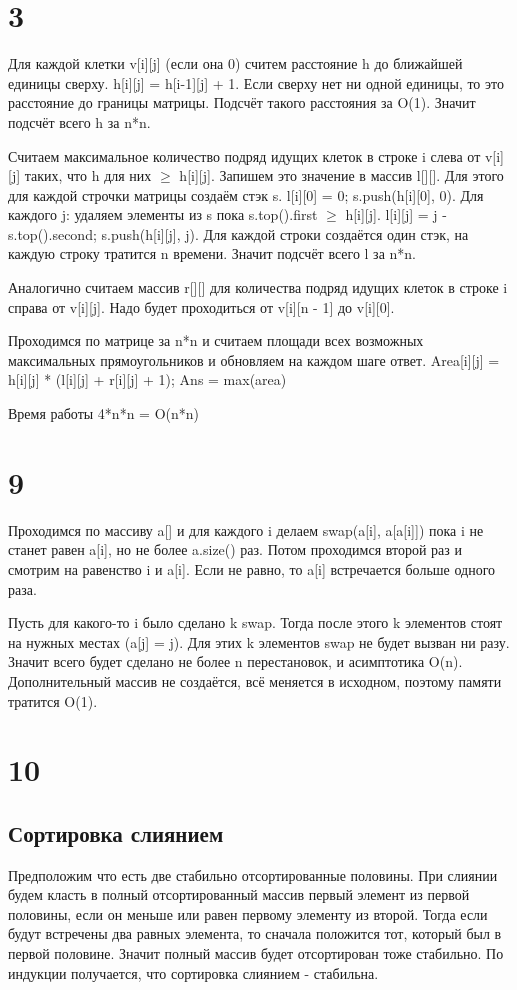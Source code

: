 \documentclass[12pt]{extarticle}
\begin{document}
\section*{3}
Для каждой клетки v[i][j] (если она 0) считем расстояние h до ближайшей единицы сверху. h[i][j] = h[i-1][j] + 1. Если сверху нет ни одной единицы, то это расстояние до границы матрицы. Подсчёт такого расстояния за O(1). Значит подсчёт всего h за n*n.

Считаем максимальное количество подряд идущих клеток в строке i слева от v[i][j] таких, что h для них $\ge$ h[i][j]. Запишем это значение в массив l[][]. Для этого для каждой строчки матрицы создаём стэк s. l[i][0] = 0; s.push({h[i][0], 0}). Для каждого j: удаляем элементы из s пока s.top().first $\ge$ h[i][j]. l[i][j] = j - s.top().second; s.push({h[i][j], j}). Для каждой строки создаётся один стэк, на каждую строку тратится n времени. Значит подсчёт всего l за n*n.

Аналогично считаем массив r[][] для количества подряд идущих клеток в строке i справа от v[i][j]. Надо будет проходиться от v[i][n - 1] до v[i][0].

Проходимся по матрице за n*n и считаем площади всех возможных максимальных прямоугольников и обновляем на каждом шаге ответ. Area[i][j] = h[i][j] * (l[i][j] + r[i][j] + 1); Ans = max(area)

Время работы 4*n*n = O(n*n)

\section*{9}
Проходимся по массиву a[] и для каждого i делаем swap(a[i], a[a[i]]) пока i не станет равен a[i], но не более a.size() раз. Потом проходимся второй раз и смотрим на равенство i и a[i]. Если не равно, то a[i] встречается больше одного раза.

Пусть для какого-то i было сделано k swap. Тогда после этого k элементов стоят на нужных местах (a[j] = j). Для этих k элементов swap не будет вызван ни разу. Значит всего будет сделано не более n перестановок, и асимптотика O(n). Дополнительный массив не создаётся, всё меняется в исходном, поэтому памяти тратится O(1).

\section*{10}
\subsection*{Сортировка слиянием}
Предположим что есть две стабильно отсортированные половины. При слиянии будем класть в полный отсортированный массив первый элемент из первой половины, если он меньше или равен первому элементу из второй. Тогда если будут встречены два равных элемента, то сначала положится тот, который был в первой половине. Значит полный массив будет отсортирован тоже стабильно. По индукции получается, что сортировка слиянием - стабильна.
\end{document}
